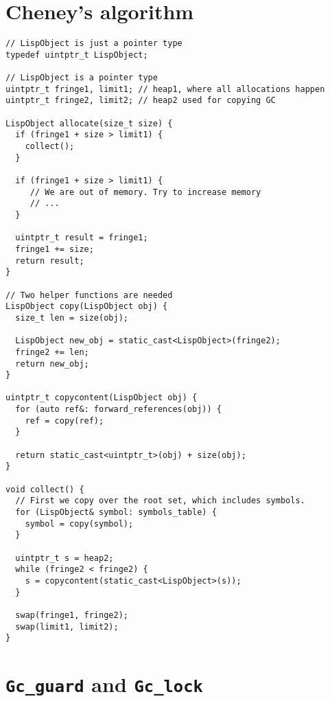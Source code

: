 \section{Cheney's algorithm}
\label{sec:cheneycode}

\begin{verbatim}
// LispObject is just a pointer type
typedef uintptr_t LispObject;

// LispObject is a pointer type
uintptr_t fringe1, limit1; // heap1, where all allocations happen
uintptr_t fringe2, limit2; // heap2 used for copying GC

LispObject allocate(size_t size) {
  if (fringe1 + size > limit1) {
    collect();
  }

  if (fringe1 + size > limit1) {
     // We are out of memory. Try to increase memory
     // ...
  }

  uintptr_t result = fringe1;
  fringe1 += size;
  return result;
}

// Two helper functions are needed
LispObject copy(LispObject obj) {
  size_t len = size(obj);

  LispObject new_obj = static_cast<LispObject>(fringe2);
  fringe2 += len;
  return new_obj;
}

uintptr_t copycontent(LispObject obj) {
  for (auto ref&: forward_references(obj)) {
    ref = copy(ref);
  }

  return static_cast<uintptr_t>(obj) + size(obj);
}

void collect() {
  // First we copy over the root set, which includes symbols.
  for (LispObject& symbol: symbols_table) {
    symbol = copy(symbol);
  }

  uintptr_t s = heap2;
  while (fringe2 < fringe2) {
    s = copycontent(static_cast<LispObject>(s));
  }

  swap(fringe1, fringe2);
  swap(limit1, limit2);
}
\end{verbatim}

\section{\texttt{Gc\_guard} and \texttt{Gc\_lock}}
\label{sec:gclock-code}

